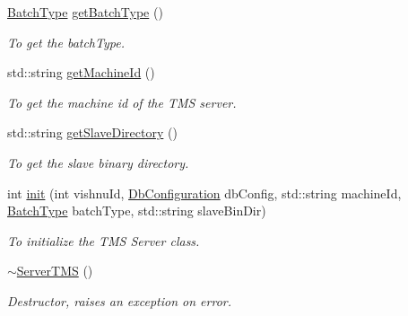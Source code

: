 \begin{DoxyCompactItemize}
\item 
\hyperlink{utilVishnu_8hpp_a864d748e7097d176552dd4c7635016ea}{BatchType} \hyperlink{classServerTMS_a60ed1874cf24873ad1ed23dedf4b8a52}{getBatchType} ()
\begin{DoxyCompactList}\small\item\em To get the batchType. \item\end{DoxyCompactList}\item 
std::string \hyperlink{classServerTMS_af752c2bd0207bf83128f31736137dca5}{getMachineId} ()
\begin{DoxyCompactList}\small\item\em To get the machine id of the TMS server. \item\end{DoxyCompactList}\item 
std::string \hyperlink{classServerTMS_ae648d1d9e96c1d4714afec133e0ee136}{getSlaveDirectory} ()
\begin{DoxyCompactList}\small\item\em To get the slave binary directory. \item\end{DoxyCompactList}\item 
int \hyperlink{classServerTMS_a0321b85dc1b8b14aa773ad4b535c33ce}{init} (int vishnuId, \hyperlink{classDbConfiguration}{DbConfiguration} dbConfig, std::string machineId, \hyperlink{utilVishnu_8hpp_a864d748e7097d176552dd4c7635016ea}{BatchType} batchType, std::string slaveBinDir)
\begin{DoxyCompactList}\small\item\em To initialize the TMS Server class. \item\end{DoxyCompactList}\item 
\hypertarget{classServerTMS_a87b307d0e656c9f0e59d782b1f9ab867}{
\hyperlink{classServerTMS_a87b307d0e656c9f0e59d782b1f9ab867}{$\sim$ServerTMS} ()}
\label{classServerTMS_a87b307d0e656c9f0e59d782b1f9ab867}

\begin{DoxyCompactList}\small\item\em Destructor, raises an exception on error. \item\end{DoxyCompactList}\end{DoxyCompactItemize}
